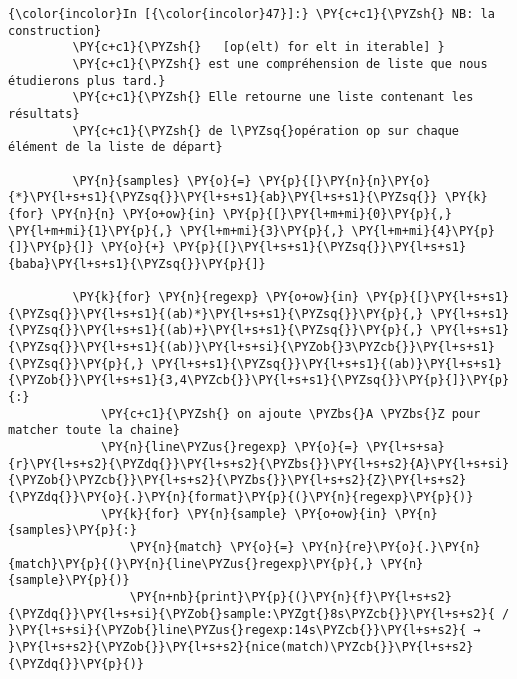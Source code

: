    \begin{Verbatim}[commandchars=\\\{\},frame=single,framerule=0.3mm,rulecolor=\color{cellframecolor}]
{\color{incolor}In [{\color{incolor}47}]:} \PY{c+c1}{\PYZsh{} NB: la construction}
         \PY{c+c1}{\PYZsh{}   [op(elt) for elt in iterable] }
         \PY{c+c1}{\PYZsh{} est une compréhension de liste que nous étudierons plus tard.}
         \PY{c+c1}{\PYZsh{} Elle retourne une liste contenant les résultats}
         \PY{c+c1}{\PYZsh{} de l\PYZsq{}opération op sur chaque élément de la liste de départ}
         
         \PY{n}{samples} \PY{o}{=} \PY{p}{[}\PY{n}{n}\PY{o}{*}\PY{l+s+s1}{\PYZsq{}}\PY{l+s+s1}{ab}\PY{l+s+s1}{\PYZsq{}} \PY{k}{for} \PY{n}{n} \PY{o+ow}{in} \PY{p}{[}\PY{l+m+mi}{0}\PY{p}{,} \PY{l+m+mi}{1}\PY{p}{,} \PY{l+m+mi}{3}\PY{p}{,} \PY{l+m+mi}{4}\PY{p}{]}\PY{p}{]} \PY{o}{+} \PY{p}{[}\PY{l+s+s1}{\PYZsq{}}\PY{l+s+s1}{baba}\PY{l+s+s1}{\PYZsq{}}\PY{p}{]}
         
         \PY{k}{for} \PY{n}{regexp} \PY{o+ow}{in} \PY{p}{[}\PY{l+s+s1}{\PYZsq{}}\PY{l+s+s1}{(ab)*}\PY{l+s+s1}{\PYZsq{}}\PY{p}{,} \PY{l+s+s1}{\PYZsq{}}\PY{l+s+s1}{(ab)+}\PY{l+s+s1}{\PYZsq{}}\PY{p}{,} \PY{l+s+s1}{\PYZsq{}}\PY{l+s+s1}{(ab)}\PY{l+s+si}{\PYZob{}3\PYZcb{}}\PY{l+s+s1}{\PYZsq{}}\PY{p}{,} \PY{l+s+s1}{\PYZsq{}}\PY{l+s+s1}{(ab)}\PY{l+s+s1}{\PYZob{}}\PY{l+s+s1}{3,4\PYZcb{}}\PY{l+s+s1}{\PYZsq{}}\PY{p}{]}\PY{p}{:}
             \PY{c+c1}{\PYZsh{} on ajoute \PYZbs{}A \PYZbs{}Z pour matcher toute la chaine}
             \PY{n}{line\PYZus{}regexp} \PY{o}{=} \PY{l+s+sa}{r}\PY{l+s+s2}{\PYZdq{}}\PY{l+s+s2}{\PYZbs{}}\PY{l+s+s2}{A}\PY{l+s+si}{\PYZob{}\PYZcb{}}\PY{l+s+s2}{\PYZbs{}}\PY{l+s+s2}{Z}\PY{l+s+s2}{\PYZdq{}}\PY{o}{.}\PY{n}{format}\PY{p}{(}\PY{n}{regexp}\PY{p}{)}
             \PY{k}{for} \PY{n}{sample} \PY{o+ow}{in} \PY{n}{samples}\PY{p}{:}
                 \PY{n}{match} \PY{o}{=} \PY{n}{re}\PY{o}{.}\PY{n}{match}\PY{p}{(}\PY{n}{line\PYZus{}regexp}\PY{p}{,} \PY{n}{sample}\PY{p}{)}
                 \PY{n+nb}{print}\PY{p}{(}\PY{n}{f}\PY{l+s+s2}{\PYZdq{}}\PY{l+s+si}{\PYZob{}sample:\PYZgt{}8s\PYZcb{}}\PY{l+s+s2}{ / }\PY{l+s+si}{\PYZob{}line\PYZus{}regexp:14s\PYZcb{}}\PY{l+s+s2}{ → }\PY{l+s+s2}{\PYZob{}}\PY{l+s+s2}{nice(match)\PYZcb{}}\PY{l+s+s2}{\PYZdq{}}\PY{p}{)}
\end{Verbatim}


